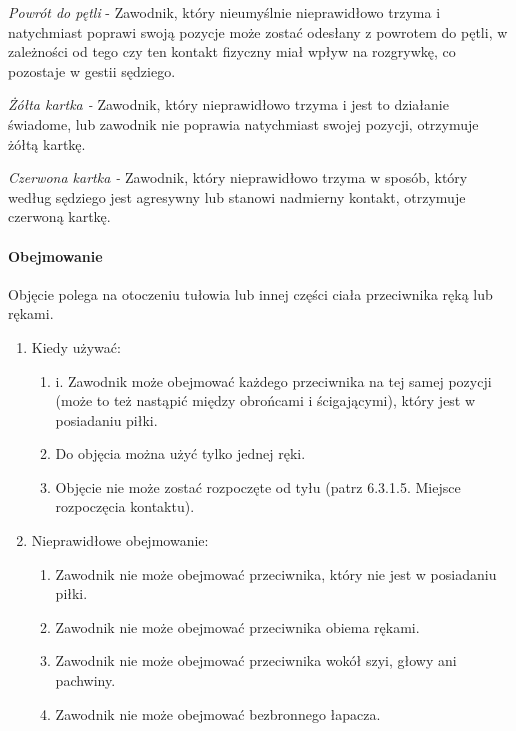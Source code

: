 \documentclass[12pt]{article}
\begin{document}
\emph{Powrót do pętli} - Zawodnik, który nieumyślnie nieprawidłowo
trzyma i natychmiast poprawi swoją pozycje może zostać odesłany z
powrotem do pętli, w zależności od tego czy ten kontakt fizyczny miał
wpływ na rozgrywkę, co pozostaje w gestii sędziego.

\emph{Żółta kartka -} Zawodnik, który nieprawidłowo trzyma i jest to
działanie świadome, lub zawodnik nie poprawia natychmiast swojej
pozycji, otrzymuje żółtą kartkę.

\emph{Czerwona kartka -} Zawodnik, który nieprawidłowo trzyma w sposób,
który według sędziego jest agresywny lub stanowi nadmierny kontakt,
otrzymuje czerwoną kartkę.

\paragraph{Obejmowanie}
Objęcie polega na otoczeniu tułowia lub
innej części ciała przeciwnika ręką lub rękami.

\begin{enumerate}
	\item
	      Kiedy używać:

	      \begin{enumerate}
		      \item
		            i. Zawodnik może obejmować każdego przeciwnika na tej samej pozycji
		            (może to też nastąpić między obrońcami i ścigającymi), który jest w
		            posiadaniu piłki.
		      \item
		            Do objęcia można użyć tylko jednej ręki.
		      \item
		            Objęcie nie może zostać rozpoczęte od tyłu (patrz 6.3.1.5. Miejsce
		            rozpoczęcia kontaktu).
	      \end{enumerate}
	\item
	      Nieprawidłowe obejmowanie:

	      \begin{enumerate}
		      \item Zawodnik nie może obejmować przeciwnika, który nie jest w posiadaniu
		            piłki.
		      \item
		            Zawodnik nie może obejmować przeciwnika obiema rękami.
		      \item
		            Zawodnik nie może obejmować przeciwnika wokół szyi, głowy ani
		            pachwiny.
		      \item
		            Zawodnik nie może obejmować bezbronnego łapacza.
	      \end{enumerate}
\end{enumerate}
\end{document}
